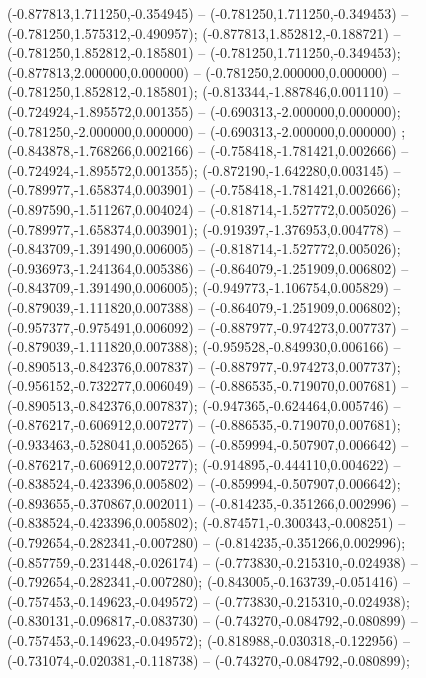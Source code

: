 (-0.877813,1.711250,-0.354945) -- (-0.781250,1.711250,-0.349453) -- (-0.781250,1.575312,-0.490957);
 (-0.877813,1.852812,-0.188721) -- (-0.781250,1.852812,-0.185801) -- (-0.781250,1.711250,-0.349453);
 (-0.877813,2.000000,0.000000) -- (-0.781250,2.000000,0.000000) -- (-0.781250,1.852812,-0.185801);
 (-0.813344,-1.887846,0.001110) -- (-0.724924,-1.895572,0.001355) -- (-0.690313,-2.000000,0.000000);
 (-0.781250,-2.000000,0.000000) -- (-0.690313,-2.000000,0.000000) ;
 (-0.843878,-1.768266,0.002166) -- (-0.758418,-1.781421,0.002666) -- (-0.724924,-1.895572,0.001355);
 (-0.872190,-1.642280,0.003145) -- (-0.789977,-1.658374,0.003901) -- (-0.758418,-1.781421,0.002666);
 (-0.897590,-1.511267,0.004024) -- (-0.818714,-1.527772,0.005026) -- (-0.789977,-1.658374,0.003901);
 (-0.919397,-1.376953,0.004778) -- (-0.843709,-1.391490,0.006005) -- (-0.818714,-1.527772,0.005026);
 (-0.936973,-1.241364,0.005386) -- (-0.864079,-1.251909,0.006802) -- (-0.843709,-1.391490,0.006005);
 (-0.949773,-1.106754,0.005829) -- (-0.879039,-1.111820,0.007388) -- (-0.864079,-1.251909,0.006802);
 (-0.957377,-0.975491,0.006092) -- (-0.887977,-0.974273,0.007737) -- (-0.879039,-1.111820,0.007388);
 (-0.959528,-0.849930,0.006166) -- (-0.890513,-0.842376,0.007837) -- (-0.887977,-0.974273,0.007737);
 (-0.956152,-0.732277,0.006049) -- (-0.886535,-0.719070,0.007681) -- (-0.890513,-0.842376,0.007837);
 (-0.947365,-0.624464,0.005746) -- (-0.876217,-0.606912,0.007277) -- (-0.886535,-0.719070,0.007681);
 (-0.933463,-0.528041,0.005265) -- (-0.859994,-0.507907,0.006642) -- (-0.876217,-0.606912,0.007277);
 (-0.914895,-0.444110,0.004622) -- (-0.838524,-0.423396,0.005802) -- (-0.859994,-0.507907,0.006642);
 (-0.893655,-0.370867,0.002011) -- (-0.814235,-0.351266,0.002996) -- (-0.838524,-0.423396,0.005802);
 (-0.874571,-0.300343,-0.008251) -- (-0.792654,-0.282341,-0.007280) -- (-0.814235,-0.351266,0.002996);
 (-0.857759,-0.231448,-0.026174) -- (-0.773830,-0.215310,-0.024938) -- (-0.792654,-0.282341,-0.007280);
 (-0.843005,-0.163739,-0.051416) -- (-0.757453,-0.149623,-0.049572) -- (-0.773830,-0.215310,-0.024938);
 (-0.830131,-0.096817,-0.083730) -- (-0.743270,-0.084792,-0.080899) -- (-0.757453,-0.149623,-0.049572);
 (-0.818988,-0.030318,-0.122956) -- (-0.731074,-0.020381,-0.118738) -- (-0.743270,-0.084792,-0.080899);
